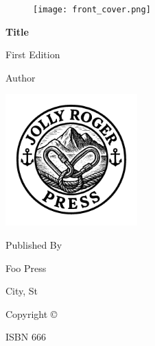 \setcounter{page}{-1}

\thispagestyle{empty}

\begin{figure}[p] %
\texttt{[image: front\_cover.png]}
\end{figure}
\restoregeometry %

\thispagestyle{empty}

\frontmatter
\begin{titlepage}
    \thispagestyle{empty}
    \begin{center}
        \LARGE
        \textbf{Title}
        
        \vspace*{1.5in}
        \Large
        First Edition
        
        \vspace*{1.5in}
        \Large
        Author
        
        \vspace*{\fill}
        \includegraphics[width=2in]{jr_press.png}
    \end{center}
    \newpage
    \thispagestyle{empty}
    \begin{center}
        \vspace*{\fill}
        Published By
        
        Foo Press
        
        City, St
        
        Copyright \copyright{}

        ISBN 666
    \end{center}
\end{titlepage}

\thispagestyle{empty}
\tableofcontents
\thispagestyle{empty}
